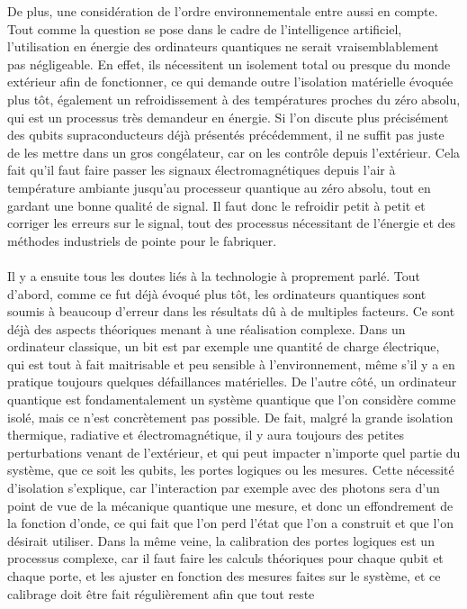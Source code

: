 De plus, une considération de l'ordre environnementale entre aussi en compte.
Tout comme la question se pose dans le cadre de l'intelligence artificiel, l'utilisation en
énergie des ordinateurs quantiques ne serait vraisemblablement pas négligeable.
En effet, ils nécessitent un isolement total ou presque du monde extérieur afin de fonctionner,
ce qui demande outre l'isolation matérielle évoquée plus tôt, également un refroidissement à des
températures proches du zéro absolu, qui est un processus très demandeur en énergie.
Si l'on discute plus précisément des qubits supraconducteurs déjà présentés précédemment, il ne
suffit pas juste de les mettre dans un gros congélateur, car on les contrôle depuis l'extérieur.
Cela fait qu'il faut faire passer les signaux électromagnétiques depuis l'air à température ambiante
jusqu'au processeur quantique au zéro absolu, tout en gardant une bonne qualité de signal.
Il faut donc le refroidir petit à petit et corriger les erreurs sur le signal, tout des processus
nécessitant de l'énergie et des méthodes industriels de pointe pour le fabriquer.\\ \\
Il y a ensuite tous les doutes liés à la technologie à proprement parlé.
Tout d'abord, comme ce fut déjà évoqué plus tôt, les ordinateurs quantiques sont soumis à
beaucoup d'erreur dans les résultats dû à de multiples facteurs.
Ce sont déjà des aspects théoriques menant à une réalisation complexe.
Dans un ordinateur classique, un bit est par exemple une quantité de charge électrique, qui est
tout à fait maitrisable et peu sensible à l'environnement, même s'il y a en pratique toujours
quelques défaillances matérielles.
De l'autre côté, un ordinateur quantique est fondamentalement un système quantique que l'on
considère comme isolé, mais ce n'est concrètement pas possible.
De fait, malgré la grande isolation thermique, radiative et électromagnétique, il y aura toujours
des petites perturbations venant de l'extérieur, et qui peut impacter n'importe quel partie du
système, que ce soit les qubits, les portes logiques ou les mesures.
Cette nécessité d'isolation s'explique, car l'interaction par exemple avec des photons sera
d'un point de vue de la mécanique quantique une mesure, et donc un effondrement de la fonction
d'onde, ce qui fait que l'on perd l'état que l'on a construit et que l'on désirait utiliser.
Dans la même veine, la calibration des portes logiques est un processus complexe, car il faut
faire les calculs théoriques pour chaque qubit et chaque porte, et les ajuster en fonction des
mesures faites sur le système, et ce calibrage doit être fait régulièrement afin que tout reste
